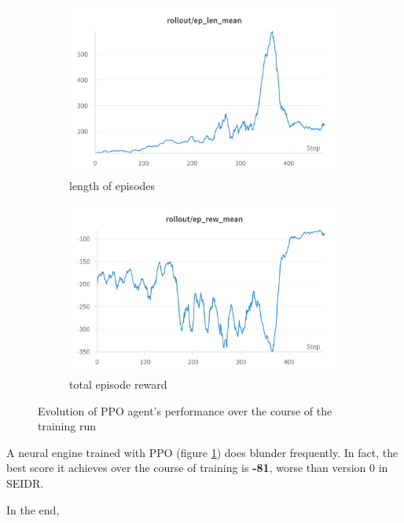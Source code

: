 \begin{figure}
    \begin{subfigure}{0.48\linewidth}
      \includegraphics[width=\linewidth]{images/auto-als-ppo-len.png}
      \caption{length of episodes}
    \end{subfigure}
    \begin{subfigure}{0.48\linewidth}
      \includegraphics[width=\linewidth]{images/auto-als-ppo-rew.png}
      \caption{total episode reward}
    \end{subfigure}
    \caption{Evolution of PPO agent's performance over the course of the training run}
    \label{fig:ppo-auto-als}
\end{figure}

A neural engine trained with PPO (figure \ref{fig:ppo-auto-als}) does blunder frequently.
In fact, the best score it achieves over the course of training is \textbf{-81}, worse than version 0 in SEIDR.

In the end,

